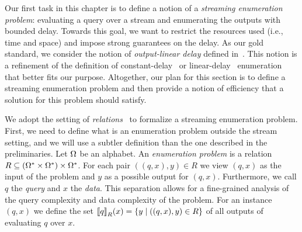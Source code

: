 


Our first task in this chapter is to define a notion of a \emph{streaming enumeration problem}: evaluating a query over a stream and enumerating the outputs with bounded delay. Towards this goal, we want to restrict the resources used (i.e., time and space) and impose strong guarantees on the delay. As our gold standard, we consider the notion of \emph{output-linear delay} defined in~\cite{FlorenzanoRUVV20}. This notion is a refinement of the definition of constant-delay~\cite{Segoufin13} or linear-delay~\cite{Courcelle09} enumeration that better fits our purpose. Altogether, our plan for this section is to define a streaming enumeration problem and then provide a notion of efficiency that a solution for this problem should satisfy. 

We adopt the setting of \emph{relations}~\cite{jerrum1986random,ArenasCJR19} to formalize a streaming enumeration problem. First, we need to define what is an enumeration problem outside the stream setting, and we will use a subtler definition than the one described in the preliminaries. 
Let $\Omega$  be an alphabet. An \emph{enumeration problem} is a relation $R\subseteq (\Omega^{*} \times \Omega^*) \times\Omega^{*}$. For each pair $((q, x), y) \in R$ we view $(q, x)$ as the input of the problem and $y$ as a possible output for $(q, x)$. 
Furthermore, we call $q$ the \emph{query} and $x$ the \emph{data}.
This separation allows for a fine-grained analysis of the query complexity and data complexity of the problem. 
For an instance $(q, x)$ we define the set ${\llbracket{q}\rrbracket}_{R}(x) = \{y \mid ((q,x), y)\in R\}$ of all outputs of evaluating $q$ over $x$.

